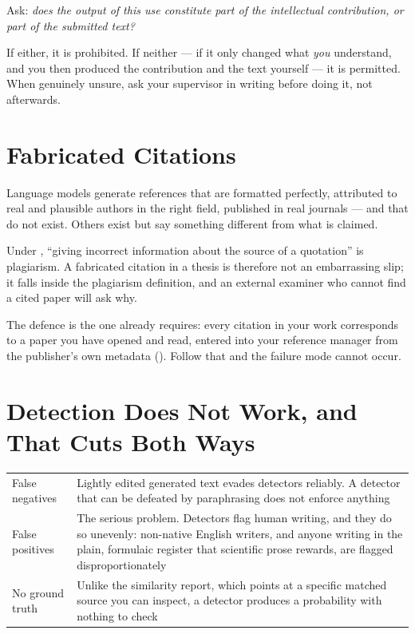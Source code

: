 \begin{conceptbox}
Ask: \emph{does the output of this use constitute part of the intellectual
contribution, or part of the submitted text?}

\medskip
If either, it is prohibited. If neither --- if it only changed what \emph{you}
understand, and you then produced the contribution and the text yourself --- it
is permitted. When genuinely unsure, ask your supervisor in writing before
doing it, not afterwards.
\end{conceptbox}

\section{Fabricated Citations}

\begin{alertbox}
Language models generate references that are formatted perfectly, attributed to
real and plausible authors in the right field, published in real journals ---
and that do not exist. Others exist but say something different from what is
claimed.

\medskip
Under , ``giving incorrect information
about the source of a quotation'' is plagiarism. A fabricated citation in a
thesis is therefore not an embarrassing slip; it falls inside the plagiarism
definition, and an external examiner who cannot find a cited paper will ask why.

\medskip
The defence is the one  already requires: every citation in
your work corresponds to a paper you have opened and read, entered into your
reference manager from the publisher's own metadata ().
Follow that and the failure mode cannot occur.
\end{alertbox}

\section{Detection Does Not Work, and That Cuts Both Ways}

\begin{center}
\small
\begin{tabular}{@{}L{3.6cm}L{10.7cm}@{}}
\toprule
False negatives
  & Lightly edited generated text evades detectors reliably. A detector that
    can be defeated by paraphrasing does not enforce anything \\
False positives
  & The serious problem. Detectors flag human writing, and they do so
    unevenly: non-native English writers, and anyone writing in the plain,
    formulaic register that scientific prose rewards, are flagged
    disproportionately \\
No ground truth
  & Unlike the similarity report, which points at a specific matched source you
    can inspect, a detector produces a probability with nothing to check \\
\bottomrule
\end{tabular}
\end{center}

